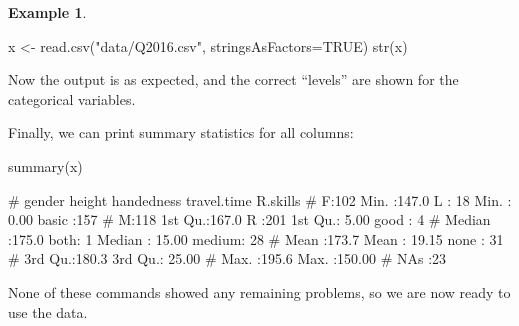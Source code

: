 \documentclass[
  a4paper,
]{article}
\newenvironment{Shaded}{\begin{snugshade}}{\end{snugshade}}
\newcommand{\AttributeTok}[1]{\textcolor[rgb]{0.77,0.63,0.00}{#1}}
\newcommand{\ConstantTok}[1]{\textcolor[rgb]{0.00,0.00,0.00}{#1}}
\newcommand{\FunctionTok}[1]{\textcolor[rgb]{0.00,0.00,0.00}{#1}}
\newcommand{\NormalTok}[1]{#1}
\newcommand{\OtherTok}[1]{\textcolor[rgb]{0.56,0.35,0.01}{#1}}
\newcommand{\StringTok}[1]{\textcolor[rgb]{0.31,0.60,0.02}{#1}}
\theoremstyle{definition}
\theoremstyle{definition}
\newtheorem{example}{Example}[section]
\theoremstyle{definition}
\theoremstyle{definition}
\theoremstyle{remark}
\begin{document}
\begin{example}
\begin{Shaded}
\begin{Highlighting}[]
\NormalTok{x }\OtherTok{\textless{}{-}} \FunctionTok{read.csv}\NormalTok{(}\StringTok{"data/Q2016.csv"}\NormalTok{, }\AttributeTok{stringsAsFactors=}\ConstantTok{TRUE}\NormalTok{)}
\FunctionTok{str}\NormalTok{(x)}
\end{Highlighting}
\end{Shaded}

\begin{Shaded}
\end{Shaded}

Now the output is as expected, and the correct ``levels'' are shown
for the categorical variables.

Finally, we can print summary statistics for all columns:

\begin{Shaded}
\begin{Highlighting}[]
\FunctionTok{summary}\NormalTok{(x)}
\end{Highlighting}
\end{Shaded}

\begin{Shaded}
\begin{Highlighting}[]
\NormalTok{\#  gender      height      handedness  travel.time       R.skills  }
\NormalTok{\#  F:102   Min.   :147.0   L   : 18   Min.   :  0.00   basic :157  }
\NormalTok{\#  M:118   1st Qu.:167.0   R   :201   1st Qu.:  5.00   good  :  4  }
\NormalTok{\#          Median :175.0   both:  1   Median : 15.00   medium: 28  }
\NormalTok{\#          Mean   :173.7              Mean   : 19.15   none  : 31  }
\NormalTok{\#          3rd Qu.:180.3              3rd Qu.: 25.00               }
\NormalTok{\#          Max.   :195.6              Max.   :150.00               }
\NormalTok{\#          NA\textquotesingle{}s   :23}
\end{Highlighting}
\end{Shaded}

None of these commands showed any remaining problems, so we are now ready
to use the data.
\end{example}
\end{document}
